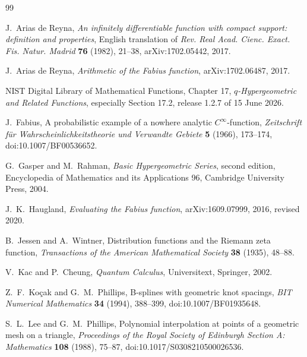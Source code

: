 \documentclass[11pt,a4paper,oneside]{article}
\theoremstyle{definition}
\theoremstyle{remark}
\begin{document}
\begin{thebibliography}{99}

J.~Arias de Reyna,
\newblock \emph{An infinitely differentiable function with compact support:
definition and properties},
\newblock English translation of \emph{Rev. Real Acad. Cienc. Exact. Fis.
Natur. Madrid} \textbf{76} (1982), 21--38,
\newblock arXiv:1702.05442, 2017.

J.~Arias de Reyna,
\newblock \emph{Arithmetic of the Fabius function},
\newblock arXiv:1702.06487, 2017.

NIST Digital Library of Mathematical Functions,
\newblock Chapter 17, \emph{$q$-Hypergeometric and Related Functions},
\newblock especially Section 17.2, release 1.2.7 of 15 June 2026.

J.~Fabius,
\newblock A probabilistic example of a nowhere analytic $C^\infty$-function,
\newblock \emph{Zeitschrift f\"ur Wahrscheinlichkeitstheorie und Verwandte
Gebiete} \textbf{5} (1966), 173--174,
\newblock doi:10.1007/BF00536652.

G.~Gasper and M.~Rahman,
\newblock \emph{Basic Hypergeometric Series}, second edition,
\newblock Encyclopedia of Mathematics and its Applications 96,
Cambridge University Press, 2004.

J.~K.~Haugland,
\newblock \emph{Evaluating the Fabius function},
\newblock arXiv:1609.07999, 2016, revised 2020.

B.~Jessen and A.~Wintner,
\newblock Distribution functions and the Riemann zeta function,
\newblock \emph{Transactions of the American Mathematical Society}
\textbf{38} (1935), 48--88.

V.~Kac and P.~Cheung,
\newblock \emph{Quantum Calculus},
\newblock Universitext, Springer, 2002.

Z.~F.~Ko\c{c}ak and G.~M.~Phillips,
\newblock B-splines with geometric knot spacings,
\newblock \emph{BIT Numerical Mathematics} \textbf{34} (1994), 388--399,
\newblock doi:10.1007/BF01935648.


S.~L.~Lee and G.~M.~Phillips,
\newblock Polynomial interpolation at points of a geometric mesh on a triangle,
\newblock \emph{Proceedings of the Royal Society of Edinburgh Section A:
Mathematics} \textbf{108} (1988), 75--87,
\newblock doi:10.1017/S0308210500026536.


\end{thebibliography}
\end{document}
